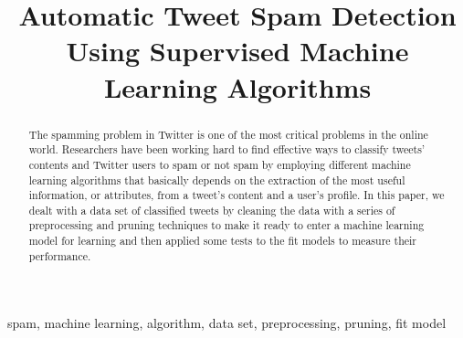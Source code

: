\documentclass[conference]{IEEEtran}
\begin{document}
\title{Automatic Tweet Spam Detection Using Supervised Machine Learning Algorithms}

\author{
\and
{}
}

\maketitle

\begin{abstract}
The spamming problem in Twitter is one of the most critical problems in the online world. Researchers have been working hard to find effective ways to classify tweets' contents and Twitter users to spam or not spam by employing different machine learning algorithms that basically depends on the extraction of the most useful information, or attributes, from a tweet's content and a user's profile. In this paper, we dealt with a data set of classified tweets by cleaning the data with a series of preprocessing and pruning techniques to make it ready to enter a machine learning model for learning and then applied some tests to the fit models to measure their performance. 
\end{abstract}

\begin{IEEEkeywords}
spam, machine learning, algorithm, data set, preprocessing, pruning, fit model
\end{IEEEkeywords}
\end{document}
